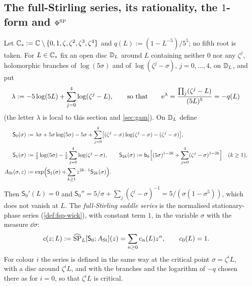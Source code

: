 
\subsection{The full-Stirling series, its rationality, the \texorpdfstring{$1$}{1}-form and \texorpdfstring{$\Phi^{\mathrm{SP}}$}{the full-Stirling WKB function}}
\label{sec:con-form}

\begin{defn}
\label{def:gam-c}
Let $\mathbb{C}_{\ast}:=\mathbb{C}\setminus\{0,1,\zeta,\zeta^2,\zeta^3,\zeta^4\}$ and $q(L):=(1-L^{-5})/5^5$; no fifth root is taken. For $L\in\mathbb{C}_{\ast}$ fix an open disc $\mathbb{D}_L$ around $L$ containing neither $0$ nor any $\zeta^j$, holomorphic branches of $\log(5\sigma)$ and of $\log(\zeta^j-\sigma)$, $j=0,\dots,4$, on $\mathbb{D}_L$, and put
\[
\lambda:=-5\log(5L)+\sum_{j=0}^4\log(\zeta^j-L),\qquad\text{so that}\qquad \mathrm{e}^{\lambda}=\frac{\prod_j(\zeta^j-L)}{(5L)^5}=-q(L)
\]
(the letter $\lambda$ is local to this section and \cref{sec:gam}). On $\mathbb{D}_L$ define
\begin{align*}
\mathsf S_0(\sigma)&:=\lambda\sigma+5\sigma\log(5\sigma)-5\sigma+\sum_{j=0}^4\bigl[(\zeta^j-\sigma)\log(\zeta^j-\sigma)-(\zeta^j-\sigma)\bigr],\\
\mathsf S_1(\sigma)&:=\tfrac12\log(5\sigma)-\tfrac12\sum_{j=0}^4\log(\zeta^j-\sigma),\qquad
\mathsf S_{2k}(\sigma):=\mathsf{b}_k\Bigl[(5\sigma)^{1-2k}+\sum_{j=0}^4(\zeta^j-\sigma)^{1-2k}\Bigr]\quad(k\geq1),\\
A_{\mathrm{St}}(\sigma,z)&:=\exp\Bigl(\mathsf S_1(\sigma)+\sum_{k\geq1}z^{2k-1}\mathsf S_{2k}(\sigma)\Bigr).
\end{align*}
Then $\mathsf S_0'(L)=0$ and $\mathsf S_0''=5/\sigma+\sum_j(\zeta^j-\sigma)^{-1}=5/(\sigma(1-\sigma^5))$, which does not vanish at $L$. The \emph{full-Stirling saddle series} is the normalised stationary-phase series (\cref{def:fsp-wick}), with constant term $1$, in the variable $\sigma$ with the measure $\dd\sigma$:
\[
c(z;L):=\widehat{\mathrm{SP}}_L[\mathsf S_0;A_{\mathrm{St}}](z)=\sum_{n\geq0}c_n(L)z^n,\qquad c_0(L)=1 .
\]
For colour $i$ the series is defined in the same way at the critical point $\sigma=\zeta^iL$, with a disc around $\zeta^iL$, and with the branches and the logarithm of $-q$ chosen there as for $i=0$, so that $\zeta^iL$ is critical.
\end{defn}

